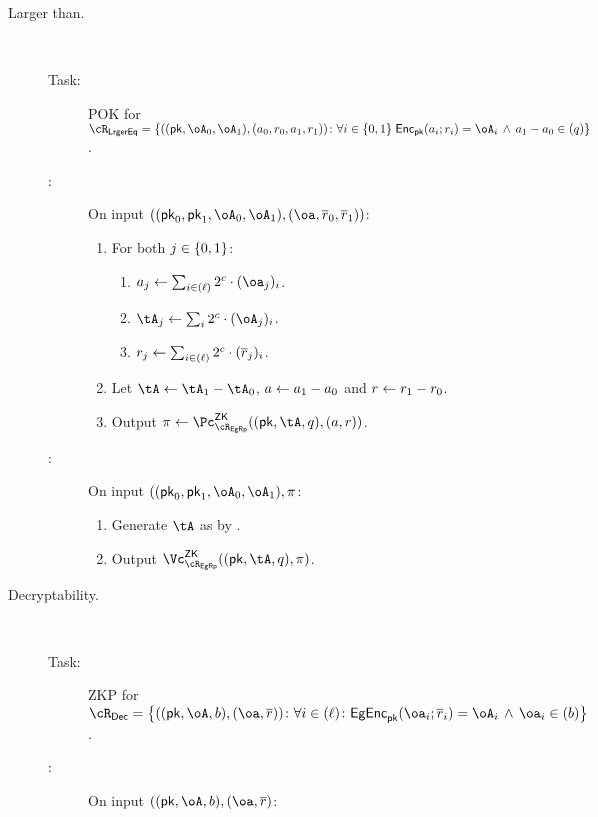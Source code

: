 \begin{description}
\begin{description}
	
\end{description}

		
\item[Larger than.]~  

\begin{description}
	\item[Task:] POK for $\rLrgEq =\rLrgEqDef$.
	
		\item[\Pc:]  On input $((\pk_0,\pk_1,\oA_0,\oA_1),(\oa,\orr_0,\orr_1))$: 
	
	
	\begin{enumerate}
		
		\item For both $j\in \zo$:
		
		\begin{enumerate}
			\item   $a_j \asn  \sum_{i\in (\ell)}    2^c \cdot (\oa_j)_i$. 
			
				\item    $\tA_j \asn  \sum_i  2^c \cdot (\oA_j)_i$. 
				\item    $r_j \leftarrow  \sum_{i\in (\ell)}  2^c \cdot (\overline{r}_j)_i$. 
				   
		\end{enumerate}
		
		\item Let $\tA \asn \tA_1 - \tA_0$, $a \leftarrow a_1 - a_0$ and $r \leftarrow r_1 - r_0$.
		\item  Output $\pi \asn \pZK{\rEgRp}((\pk,\tA,q), (a,r))$.
	\end{enumerate}
	
	
	\item[\Vc:]  On input $((\pk_0,\pk_1,\oA_0,\oA_1),\pi$: 
	
	\begin{enumerate}
		\item  Generate $\tA$ as by \Pc.
		
		\item  Output $\vZK{\rEgRp}((\pk,\tA,q), \pi)$.
		
	\end{enumerate}
\end{description}
 


\item[Decryptability.]  ~


\begin{description}
	\item[Task:] ZKP for $\rDec =\rDecDef$.
	
	\item[\Pc:] On  input  $((\pk,\oA,b),(\oa,\orr)$:
	

\end{description}
\end{description}
